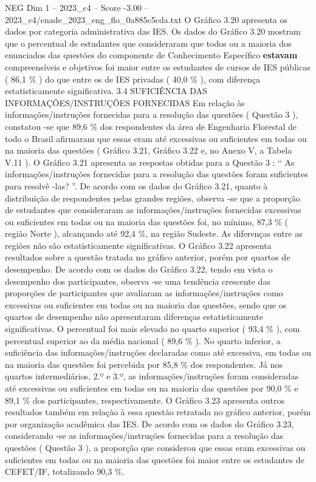 \begin{textsample}{NEG Dim 1 – 2023\_c4 – Score -3.00 – 2023\_c4/enade\_2023\_eng\_flo\_0a885c5cda.txt}
O Gráfico 3.20 apresenta os dados por categoria administrativa das IES.
Os dados do Gráfico 3.20 mostram que o percentual de estudantes que consideraram que todos ou a maioria dos enunciados das questões do componente de Conhecimento Específico \textbf{estavam} compreensíveis e objetivos foi maior entre os estudantes de cursos de IES públicas ( 86,1 \% ) do que entre os de IES privadas ( 40,0 \% ), com diferença estatisticamente significativa. 3.4 SUFICIÊNCIA DAS INFORMAÇÕES/INSTRUÇÕES FORNECIDAS Em relação às informações/instruções fornecidas para a resolução das questões ( Questão 3 ), constatou -se que 89,6 \% dos respondentes da área de Engenharia Florestal de todo o Brasil afirmaram que essas eram até excessivas ou suficientes em todas ou na maioria das questões ( Gráfico 3.21, Gráfico 3.22 e, no Anexo V, a Tabela V.11 ).
O Gráfico 3.21 apresenta as respostas obtidas para a Questão 3 : “ As informações/instruções fornecidas para a resolução das questões foram suficientes para resolvê -las? ”.
De acordo com os dados do Gráfico 3.21, quanto à distribuição de respondentes pelas grandes regiões, observa -se que a proporção de estudantes que consideraram as informações/instruções fornecidas excessivas ou suficientes em todas ou na maioria das questões foi, no mínimo, 87,3 \% ( região Norte ), alcançando até 92,4 \%, na região Sudeste.
As diferenças entre as regiões não são estatisticamente significativas.
O Gráfico 3.22 apresenta resultados sobre a questão tratada no gráfico anterior, porém por quartos de desempenho.
De acordo com os dados do Gráfico 3.22, tendo em vista o desempenho dos participantes, observa -se uma tendência crescente das proporções de participantes que avaliaram as informações/instruções como excessivas ou suficientes em todas ou na maioria das questões, sendo que os quartos de desempenho não apresentaram diferenças estatisticamente significativas.
O percentual foi mais elevado no quarto superior ( 93,4 \% ), com percentual superior ao da média nacional ( 89,6 \% ).
No quarto inferior, a suficiência das informações/instruções declaradas como até excessiva, em todas ou na maioria das questões foi percebida por 85,8 \% dos respondentes.
Já nos quartos intermediários, 2.º e 3.º, as informações/instruções foram consideradas até excessivas ou suficientes em todas ou na maioria das questões por 90,0 \% e 89,1 \% dos participantes, respectivamente.
O Gráfico 3.23 apresenta outros resultados também em relação à essa questão retratada no gráfico anterior, porém por organização acadêmica das IES.
De acordo com os dados do Gráfico 3.23, considerando -se as informações/instruções fornecidas para a resolução das questões ( Questão 3 ), a proporção que considerou que essas eram excessivas ou suficientes em todas ou na maioria das questões foi maior entre os estudantes de CEFET/IF, totalizando 90,3 \%.

\end{textsample}
